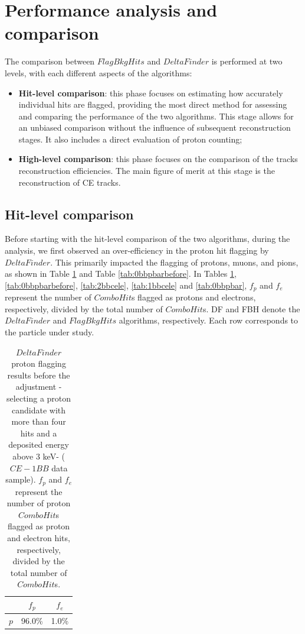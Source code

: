 \section{Performance analysis and comparison}
The comparison between $FlagBkgHits$ and $DeltaFinder$ 
is performed at two levels, with each 
different aspects of the algorithms: 
\begin{itemize}
    \item \textbf{Hit-level comparison}: this 
    phase focuses 
    on estimating how accurately individual hits are 
    flagged, providing the most direct method for 
    assessing and comparing the performance of the two 
    algorithms. This stage allows for an unbiased 
    comparison without the influence of subsequent 
    reconstruction stages. It also includes a 
    direct evaluation of proton counting;
    
    \item \textbf{High-level comparison}: this phase focuses on the 
    comparison of the tracks reconstruction efficiencies. The main figure 
    of merit at this stage is the 
    reconstruction of CE tracks.

\end{itemize}

\subsection{Hit-level comparison}
Before starting with the hit-level 
comparison of the two algorithms, during the analysis, 
we first observed an over-efficiency 
in the proton hit flagging by $DeltaFinder$. 
This primarily impacted the flagging of 
protons, muons, and pions, as shown in 
Table \ref{tab:1bbcelebefore} and Table 
\ref{tab:0bbpbarbefore}. In Tables 
\ref{tab:1bbcelebefore}, \ref{tab:0bbpbarbefore}, 
\ref{tab:2bbcele}, \ref{tab:1bbcele} and 
\ref{tab:0bbpbar}, $f_p$ and 
$f_e$ represent 
the number of $ComboHit$s flagged as 
protons and electrons, respectively, 
divided by the total number of 
$ComboHit$s. DF and FBH denote the $DeltaFinder$ 
and $FlagBkgHits$ algorithms, 
respectively. Each row corresponds to the particle 
under study.

\begin{center}
    \begin{table}[h!]
    \centering
    \renewcommand{\arraystretch}{1.}
    \begin{tabular}{| c | c | c |} 
    \hline
    & $f_{p}$ & $f_{e}$ \\
    \hline
    $p$     & 96.0\% & 1.0\% \\
    \hline
    \end{tabular}
    \caption{$DeltaFinder$ proton 
    flagging results before the 
    adjustment -selecting a proton 
    candidate with more than four hits 
    and a deposited energy above 3 keV- ($CE-1BB$ data sample). 
    $f_p$ and $f_e$ represent 
    the number of proton $ComboHit$s 
    flagged as proton and electron hits, respectively, 
    divided by the total number of  $ComboHit$s.}
    \label{tab:1bbcelebefore}
    \end{table}
\end{center}
    
